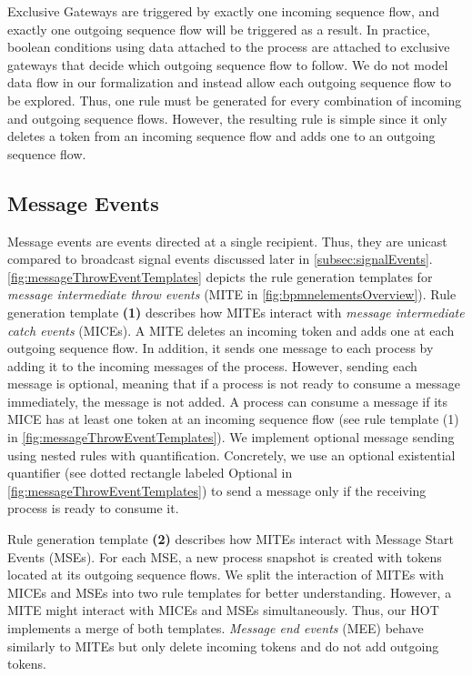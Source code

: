 \documentclass{lmcs} %
\begin{document}
Exclusive Gateways are triggered by exactly one incoming sequence flow, and exactly one outgoing sequence flow will be triggered as a result.
In practice, boolean conditions using data attached to the process are attached to exclusive gateways that decide which outgoing sequence flow to follow.
We do not model data flow in our formalization and instead allow each outgoing sequence flow to be explored. 
Thus, one rule must be generated for every combination of incoming and outgoing sequence flows.
However, the resulting rule is simple since it only deletes a token from an incoming sequence flow and adds one to an outgoing sequence flow.

\subsection{Message Events}
Message events are events directed at a single recipient.
Thus, they are unicast compared to broadcast signal events discussed later in \autoref{subsec:signalEvents}.
\autoref{fig:messageThrowEventTemplates} depicts the rule generation templates for \textit{message intermediate throw events} (\textsf{MITE} in \autoref{fig:bpmnelementsOverview}).
Rule generation template \textbf{(1)} describes how MITEs interact with \textit{message intermediate catch events} (MICEs).
A MITE deletes an incoming token and adds one at each outgoing sequence flow.
In addition, it sends one message to each process by adding it to the incoming messages of the process.
However, sending each message is optional, meaning that if a process is not ready to consume a message immediately, the message is not added.
A process can consume a message if its MICE has at least one token at an incoming sequence flow (see rule template (1) in \autoref{fig:messageThrowEventTemplates}).
We implement optional message sending using nested rules with quantification.
Concretely, we use an optional existential quantifier \cite{rensinkNestedQuantificationGraph2006} (see dotted rectangle labeled \textsf{Optional} in \autoref{fig:messageThrowEventTemplates}) to send a message only if the receiving process is ready to consume it.

Rule generation template \textbf{(2)} describes how MITEs interact with Message Start Events (MSEs).
For each MSE, a new process snapshot is created with tokens located at its outgoing sequence flows.
We split the interaction of MITEs with MICEs and MSEs into two rule templates for better understanding.
However, a MITE might interact with MICEs and MSEs simultaneously.
Thus, our HOT implements a merge of both templates. 
\textit{Message end events} (\textsf{MEE}) behave similarly to MITEs but only delete incoming tokens and do not add outgoing tokens.
\end{document}
